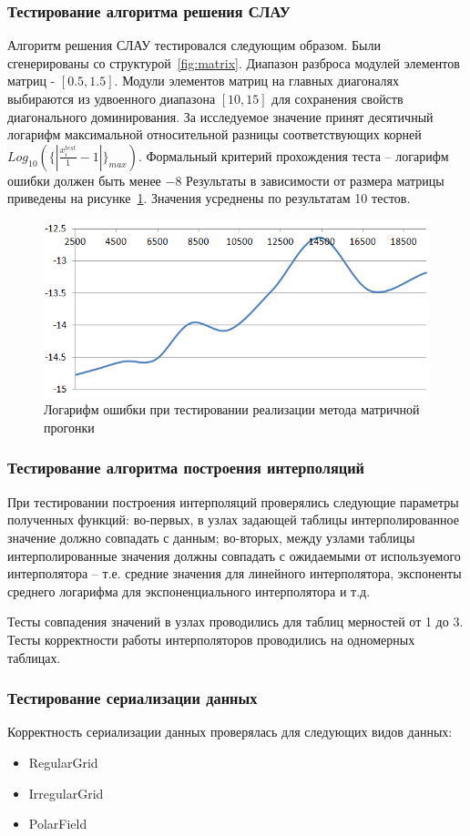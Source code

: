 \subsubsection{Тестирование алгоритма решения СЛАУ}
Алгоритм решения СЛАУ тестировался следующим образом.
Были сгенерированы со структурой~\ref{fig:matrix}. Диапазон разброса модулей 
элементов матриц - $[0.5, 1.5]$. Модули элементов матриц на главных диагоналях 
выбираются из удвоенного диапазона $[10, 15]$ для сохранения свойств 
диагонального доминирования. За исследуемое значение принят десятичный логарифм 
максимальной относительной разницы соответствующих корней 
$Log_{10}(\{|\frac{x_i^{test}}{1} - 1|\}_{max})$. Формальный критерий 
прохождения теста -- логарифм ошибки должен быть менее $-8$
Результаты в зависимости от размера матрицы приведены на 
рисунке~\ref{fig:testMatrix}. Значения усреднены по результатам 10 тестов.

\begin{figure}
    \centering
    \includegraphics[width=.6\textwidth]{img/test/matrix}
    \caption{Логарифм ошибки при тестировании реализации метода матричной 
    прогонки}
    \label{fig:testMatrix}
\end{figure}

\subsubsection{Тестирование алгоритма построения интерполяций}
При тестировании построения интерполяций проверялись следующие параметры 
полученных функций: во-первых, в узлах задающей таблицы интерполированное 
значение должно совпадать с данным; во-вторых, между узлами таблицы 
интерполированные значения должны совпадать с ожидаемыми от используемого 
интерполятора -- т.е. средние значения для линейного интерполятора, экспоненты 
среднего логарифма для экспоненциального интерполятора и т.д.

Тесты совпадения значений в узлах проводились для таблиц мерностей от 1 до 3. 
Тесты корректности работы интерполяторов проводились на одномерных таблицах.

\subsubsection{Тестирование сериализации данных}
Корректность сериализации данных проверялась для следующих видов данных:
\begin{itemize}
    \item RegularGrid
    \item IrregularGrid
    \item PolarField
\end{itemize}

